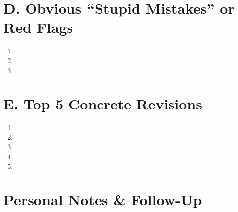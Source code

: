\documentclass[11pt, letterpaper]{article}
\begin{document}
\section*{D. Obvious ``Stupid Mistakes'' or Red Flags}
\begin{enumerate}[leftmargin=*, nosep]
  \item \vspace{1.2cm}
  \item \vspace{1.2cm}
  \item \vspace{1.2cm}
\end{enumerate}

\section*{E. Top 5 Concrete Revisions}
\begin{enumerate}[leftmargin=*, nosep]
  \item \vspace{1.2cm}
  \item \vspace{1.2cm}
  \item \vspace{1.2cm}
  \item \vspace{1.2cm}
  \item \vspace{1.2cm}
\end{enumerate}

\section*{Personal Notes \& Follow-Up}

\begin{notebox}
\vspace{4cm}
\end{notebox}
\end{document}
